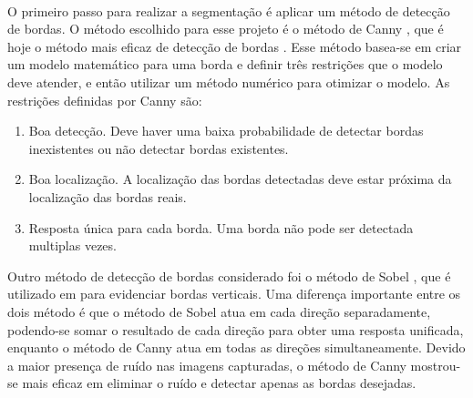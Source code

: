 \paragraph{}O primeiro passo para realizar a segmentação é aplicar um método de detecção de bordas. O método escolhido para esse projeto é o método de Canny \cite{Canny86}, que é hoje o método mais eficaz de detecção de bordas \cite{Juneja09}. Esse método basea-se em criar um modelo matemático para uma borda e definir três restrições que o modelo deve atender, e então utilizar um método numérico para otimizar o modelo. As restrições definidas por Canny \cite{Canny86} são:
\begin{enumerate}
\item Boa detecção. Deve haver uma baixa probabilidade de detectar bordas inexistentes ou não detectar bordas existentes.
\item Boa localização. A localização das bordas detectadas deve estar próxima da localização das bordas reais.
\item Resposta única para cada borda. Uma borda não pode ser detectada multiplas vezes.
\end{enumerate}
\noindent{}Outro método de detecção de bordas considerado foi o método de Sobel \cite{Gonzalez92}, que é utilizado em \cite{Griffith11} para evidenciar bordas verticais. Uma diferença importante entre os dois método é que o método de Sobel atua em cada direção separadamente, podendo-se somar o resultado de cada direção para obter uma resposta unificada, enquanto o método de Canny atua em todas as direções simultaneamente. Devido a maior presença de ruído nas imagens capturadas, o método de Canny mostrou-se mais eficaz em eliminar o ruído e detectar apenas as bordas desejadas.
